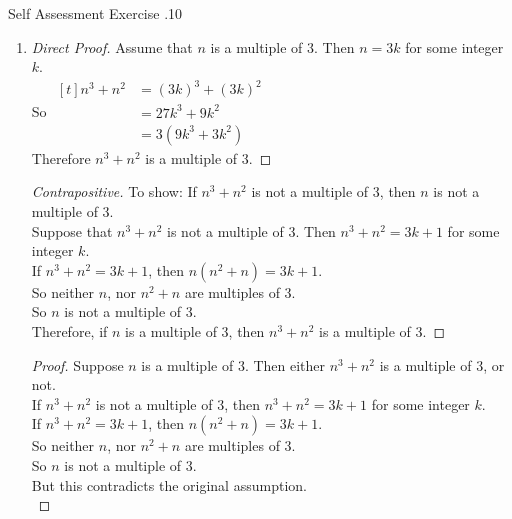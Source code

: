\documentclass[\main/notes.tex]{subfiles}
\begin{document}
\begin{exercise}{Self Assessment Exercise \thechapter.10}
\begin{enumerate}
\begin{enumerate}[label=(\alph*)]
\begin{proof}[Contradiction]
										So $x$ is odd.\\
										But this contradicts the original assumption, so it must be the case that $x^{2} + 4x + 2$ is even.
									\end{proof}
								\item {}
									\begin{proof}[Direct Proof]
										Assume that $n$ is a multiple of $3$. Then $n = 3k$ for some integer $k$.\\
										So $\begin{aligned}[t]
											n^{3} + n^{2} &= (3k)^{3} + (3k)^{2}\\
											&= 27k^{3} + 9k^{2}\\
											&= 3(9k^{3} + 3k^{2})
										\end{aligned} $\\
										Therefore $n^{3} + n^{2}$ is a multiple of $3$.
									\end{proof}
									\begin{proof}[Contrapositive]
										To show: If $n^{3} + n^{2}$ is not a multiple of $3$, then $n$ is not a multiple of $3$.\\
										Suppose that $n^{3} + n^{2}$ is not a multiple of $3$. Then $n^{3} + n^{2} = 3k + 1$ for some integer $k$.\\
										If $n^{3} + n^{2} = 3k + 1$, then $n(n^{2} + n) = 3k + 1$.\\
										So neither $n$, nor $n^{2} + n$ are multiples of $3$.\\
										So $n$ is not a multiple of $3$.\\
										Therefore, if $n$ is a multiple of $3$, then $n^{3} + n^{2}$ is a multiple of $3$.
									\end{proof}
									\begin{proof}
										Suppose $n$ is a multiple of $3$. Then either $n^{3} + n^{2}$ is a multiple of $3$, or not.\\
										If $n^{3} + n^{2}$ is not a multiple of $3$, then $n^{3} + n^{2} = 3k + 1$ for some integer $k$.\\
										If $n^{3} + n^{2} = 3k + 1$, then $n(n^{2} + n) = 3k + 1$.\\
										So neither $n$, nor $n^{2} + n$ are multiples of $3$.\\
										So $n$ is not a multiple of $3$.\\
										But this contradicts the original assumption.\\

\end{proof}
\end{enumerate}
\end{enumerate}
\end{exercise}
\end{document}
